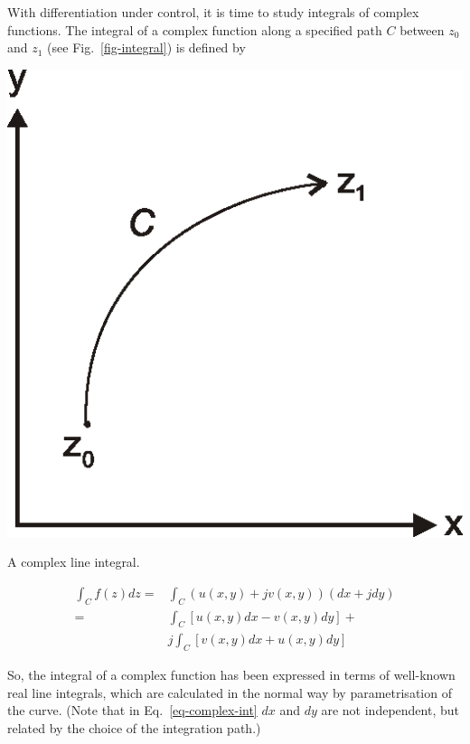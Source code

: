 \pagebreak



With differentiation under control, it is time to study integrals of complex functions. The integral of a complex function along a specified path ${C}$ between $z_0$ and $z_1$ (see Fig.~\ref{fig-integral}) is defined by

\begin{marginfigure}[]
\centering
\includegraphics{complex/figures/integral}
\caption{A complex line integral.}
\label{fig-integral}
\end{marginfigure}

\begin{align}
\int_{C}f(z)dz = & \int_{C}\left(u(x,y)+jv(x,y)\right)(dx+jdy)
\nonumber \\
  = & \int_{C}\left[u(x,y)dx-v(x,y)dy\right] + \nonumber\\
  & j\int_{C}\left[v(x,y)dx+u(x,y)dy\right] \label{eq-complex-int}
\end{align} 

So, the integral of a complex function has been expressed in terms of well-known real line integrals, which are calculated in the normal way by parametrisation of the curve. (Note that in Eq.~\ref{eq-complex-int} $dx$ and $dy$ are not independent, but related by the choice of the integration path.)

